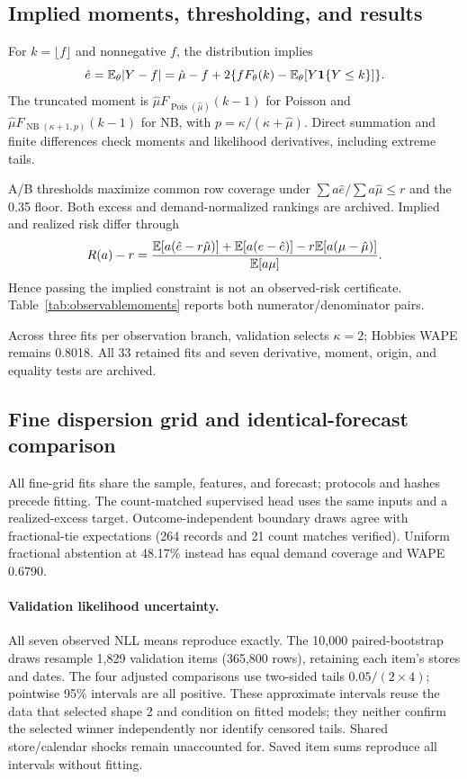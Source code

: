 \subsection{Implied moments, thresholding, and results}
For $k=\lfloor f\rfloor$ and nonnegative $f$, the distribution implies
\[
 \hat e=\mathbb{E}_\theta|Y-f|=\hat\mu-f+2\{fF_\theta(k)-\mathbb{E}_\theta[Y\mathbf{1}\{Y\leq k\}]\}.
\]
The truncated moment is $\hat\mu F_{\operatorname{Pois}(\hat\mu)}(k-1)$ for Poisson and $\hat\mu F_{\operatorname{NB}(\kappa+1,p)}(k-1)$ for NB, with $p=\kappa/(\kappa+\hat\mu)$. Direct summation and finite differences check moments and likelihood derivatives, including extreme tails.

A/B thresholds maximize common row coverage under $\sum a\hat e/\sum a\hat\mu\leq r$ and the 0.35 floor. Both excess and demand-normalized rankings are archived. Implied and realized risk differ through
\[
 R(a)-r=\frac{\mathbb{E}[a(\hat e-r\hat\mu)]+\mathbb{E}[a(e-\hat e)]-r\mathbb{E}[a(\mu-\hat\mu)]}{\mathbb{E}[a\mu]}.
\]
Hence passing the implied constraint is not an observed-risk certificate. Table~\ref{tab:observablemoments} reports both numerator/denominator pairs.


Across three fits per observation branch, validation selects $\kappa=2$; Hobbies WAPE remains 0.8018. All 33 retained fits and seven derivative, moment, origin, and equality tests are archived.

\FloatBarrier
\subsection{Fine dispersion grid and identical-forecast comparison}
All fine-grid fits share the sample, features, and forecast; protocols and hashes precede fitting. The count-matched supervised head uses the same inputs and a realized-excess target. Outcome-independent boundary draws agree with fractional-tie expectations (264 records and 21 count matches verified). Uniform fractional abstention at 48.17\% instead has equal demand coverage and WAPE 0.6790.

\paragraph{Validation likelihood uncertainty.}
All seven observed NLL means reproduce exactly. The 10,000 paired-bootstrap draws resample 1,829 validation items (365,800 rows), retaining each item's stores and dates. The four adjusted comparisons use two-sided tails $0.05/(2\times4)$; pointwise 95\% intervals are all positive. These approximate intervals reuse the data that selected shape 2 and condition on fitted models; they neither confirm the selected winner independently nor identify censored tails. Shared store/calendar shocks remain unaccounted for. Saved item sums reproduce all intervals without fitting.


